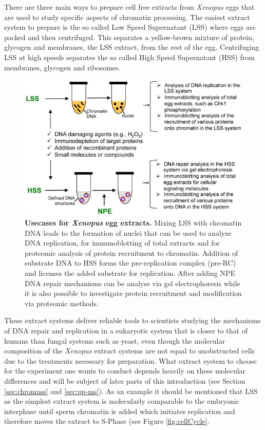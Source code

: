\newpage
There are three main ways to prepare cell free extracts from \textit{Xenopus} eggs that are used to study specific aspects of chromatin processing. The easiest extract system to prepare is the so called Low Speed Supernatant (LSS) where eggs are packed and then centrifuged. This separates a yellow-brown mixture of protein, glycogen and membranes, the LSS extract, from the rest of the egg. Centrifuging LSS at high speeds separates the so called High Speed Supernatant (HSS) from membranes, glycogen and ribosomes. 
\begin{figure}[H]
    \centering
    \includegraphics[width=.88\textwidth]{resources/images/Intro/extracts_uses.jpg}
    \caption[Usecases for \textit{Xenopus} egg extracts]{\textbf{Usecases for \textit{Xenopus} egg extracts.} Mixing LSS with chromatin DNA leads to the formation of nuclei that can be used to analyze DNA replication, for immunoblotting of total extracts and for proteomic analysis of protein recruitment to chromatin. Addition of substrate DNA to HSS forms the pre-replication complex (pre-RC) and licenses the added substrate for replication. After adding NPE DNA repair mechanisms can be analyse via gel electrophoresis while it is also possible to investigate protein recruitment and modification via proteomic methods.  \\\citep{Cupello.2016}}
    \label{fig:extract_uses}
\end{figure}
These extract systems deliver reliable tools to scientists studying the mechanisms of DNA repair and replication in a eukaryotic system that is closer to that of humans than fungal systems such as yeast, even though the molecular composition of the \textit{Xenopus} extract systems are not equal to unobstructed cells due to the treatments necessary for preparation. What extract system to choose for the experiment one wants to conduct depends heavily on these molecular differences and will be subject of later parts of this introduction (see Section \ref{sec:chromass} and \ref{sec:pp-ms}). As an example it should be mentioned that LSS as the simplest extract system is molecularly comparable to the embryonic interphase until sperm chromatin is added which initiates replication and therefore moves the extract to S-Phase (see Figure \ref{fig:cellCycle}.\\\\
